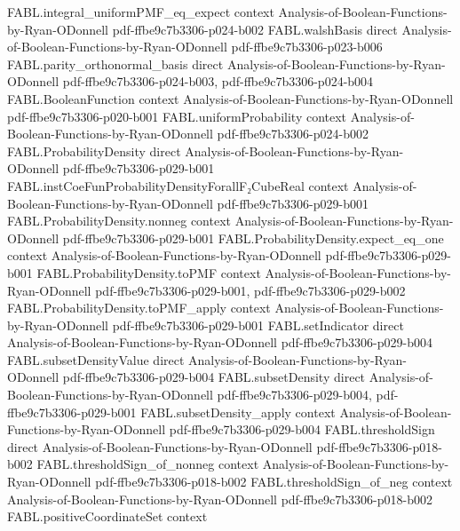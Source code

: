 \begin{theorem}
\proofstep
  {FABL.integral_uniformPMF_eq_expect}
  {context}
  {Analysis-of-Boolean-Functions-by-Ryan-ODonnell}
  {pdf-ffbe9c7b3306-p024-b002}
\proofstep
  {FABL.walshBasis}
  {direct}
  {Analysis-of-Boolean-Functions-by-Ryan-ODonnell}
  {pdf-ffbe9c7b3306-p023-b006}
\proofstep
  {FABL.parity_orthonormal_basis}
  {direct}
  {Analysis-of-Boolean-Functions-by-Ryan-ODonnell}
  {pdf-ffbe9c7b3306-p024-b003,
    pdf-ffbe9c7b3306-p024-b004}
\proofstep
  {FABL.BooleanFunction}
  {context}
  {Analysis-of-Boolean-Functions-by-Ryan-ODonnell}
  {pdf-ffbe9c7b3306-p020-b001}
\proofstep
  {FABL.uniformProbability}
  {context}
  {Analysis-of-Boolean-Functions-by-Ryan-ODonnell}
  {pdf-ffbe9c7b3306-p024-b002}
\proofstep
  {FABL.ProbabilityDensity}
  {direct}
  {Analysis-of-Boolean-Functions-by-Ryan-ODonnell}
  {pdf-ffbe9c7b3306-p029-b001}
\proofstep
  {FABL.instCoeFunProbabilityDensityForallF₂CubeReal}
  {context}
  {Analysis-of-Boolean-Functions-by-Ryan-ODonnell}
  {pdf-ffbe9c7b3306-p029-b001}
\proofstep
  {FABL.ProbabilityDensity.nonneg}
  {context}
  {Analysis-of-Boolean-Functions-by-Ryan-ODonnell}
  {pdf-ffbe9c7b3306-p029-b001}
\proofstep
  {FABL.ProbabilityDensity.expect_eq_one}
  {context}
  {Analysis-of-Boolean-Functions-by-Ryan-ODonnell}
  {pdf-ffbe9c7b3306-p029-b001}
\proofstep
  {FABL.ProbabilityDensity.toPMF}
  {context}
  {Analysis-of-Boolean-Functions-by-Ryan-ODonnell}
  {pdf-ffbe9c7b3306-p029-b001,
    pdf-ffbe9c7b3306-p029-b002}
\proofstep
  {FABL.ProbabilityDensity.toPMF_apply}
  {context}
  {Analysis-of-Boolean-Functions-by-Ryan-ODonnell}
  {pdf-ffbe9c7b3306-p029-b001}
\proofstep
  {FABL.setIndicator}
  {direct}
  {Analysis-of-Boolean-Functions-by-Ryan-ODonnell}
  {pdf-ffbe9c7b3306-p029-b004}
\proofstep
  {FABL.subsetDensityValue}
  {direct}
  {Analysis-of-Boolean-Functions-by-Ryan-ODonnell}
  {pdf-ffbe9c7b3306-p029-b004}
\proofstep
  {FABL.subsetDensity}
  {direct}
  {Analysis-of-Boolean-Functions-by-Ryan-ODonnell}
  {pdf-ffbe9c7b3306-p029-b004,
    pdf-ffbe9c7b3306-p029-b001}
\proofstep
  {FABL.subsetDensity_apply}
  {context}
  {Analysis-of-Boolean-Functions-by-Ryan-ODonnell}
  {pdf-ffbe9c7b3306-p029-b004}
\proofstep
  {FABL.thresholdSign}
  {direct}
  {Analysis-of-Boolean-Functions-by-Ryan-ODonnell}
  {pdf-ffbe9c7b3306-p018-b002}
\proofstep
  {FABL.thresholdSign_of_nonneg}
  {context}
  {Analysis-of-Boolean-Functions-by-Ryan-ODonnell}
  {pdf-ffbe9c7b3306-p018-b002}
\proofstep
  {FABL.thresholdSign_of_neg}
  {context}
  {Analysis-of-Boolean-Functions-by-Ryan-ODonnell}
  {pdf-ffbe9c7b3306-p018-b002}
\proofstep
  {FABL.positiveCoordinateSet}
  {context}

\end{theorem}
